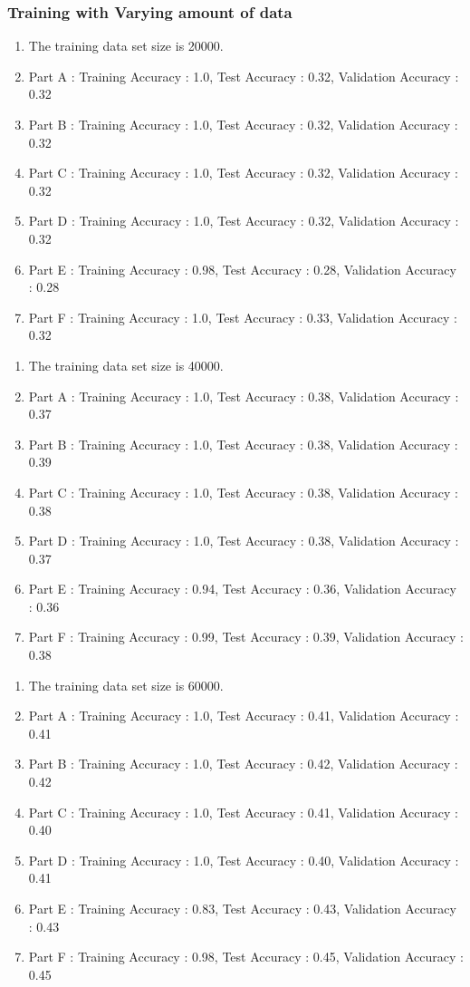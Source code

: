 \documentclass[11pt]{article}
\begin{document}
\subsubsection{Training with Varying amount of data}
\begin{enumerate}
    \item The training data set size is 20000.
    \item Part A : Training Accuracy : 1.0, Test Accuracy : 0.32, Validation Accuracy : 0.32
    \item Part B : Training Accuracy : 1.0, Test Accuracy : 0.32, Validation Accuracy : 0.32
    \item Part C : Training Accuracy : 1.0, Test Accuracy : 0.32, Validation Accuracy : 0.32
    \item Part D : Training Accuracy : 1.0, Test Accuracy : 0.32, Validation Accuracy : 0.32
    \item Part E : Training Accuracy : 0.98, Test Accuracy : 0.28, Validation Accuracy : 0.28
    \item Part F : Training Accuracy : 1.0, Test Accuracy : 0.33, Validation Accuracy : 0.32
\end{enumerate}
\hline
\begin{enumerate}
    \item The training data set size is 40000.
    \item Part A : Training Accuracy : 1.0, Test Accuracy : 0.38, Validation Accuracy : 0.37
    \item Part B : Training Accuracy : 1.0, Test Accuracy : 0.38, Validation Accuracy : 0.39
    \item Part C : Training Accuracy : 1.0, Test Accuracy : 0.38, Validation Accuracy : 0.38
    \item Part D : Training Accuracy : 1.0, Test Accuracy : 0.38, Validation Accuracy : 0.37
    \item Part E : Training Accuracy : 0.94, Test Accuracy : 0.36, Validation Accuracy : 0.36
    \item Part F : Training Accuracy : 0.99, Test Accuracy : 0.39, Validation Accuracy : 0.38
\end{enumerate}
\hline
\begin{enumerate}
    \item The training data set size is 60000.
    \item Part A : Training Accuracy : 1.0, Test Accuracy : 0.41, Validation Accuracy : 0.41
    \item Part B : Training Accuracy : 1.0, Test Accuracy : 0.42, Validation Accuracy : 0.42
    \item Part C : Training Accuracy : 1.0, Test Accuracy : 0.41, Validation Accuracy : 0.40
    \item Part D : Training Accuracy : 1.0, Test Accuracy : 0.40, Validation Accuracy : 0.41
    \item Part E : Training Accuracy : 0.83, Test Accuracy : 0.43, Validation Accuracy : 0.43
    \item Part F : Training Accuracy : 0.98, Test Accuracy : 0.45, Validation Accuracy : 0.45
\end{enumerate}
\end{document}
